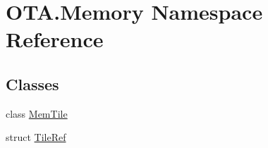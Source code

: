 \hypertarget{namespace_o_t_a_1_1_memory}{}\section{O\+T\+A.\+Memory Namespace Reference}
\label{namespace_o_t_a_1_1_memory}
\subsection*{Classes}
\begin{DoxyCompactItemize}
\item 
class \hyperlink{class_o_t_a_1_1_memory_1_1_mem_tile}{Mem\+Tile}
\item 
struct \hyperlink{struct_o_t_a_1_1_memory_1_1_tile_ref}{Tile\+Ref}
\end{DoxyCompactItemize}

